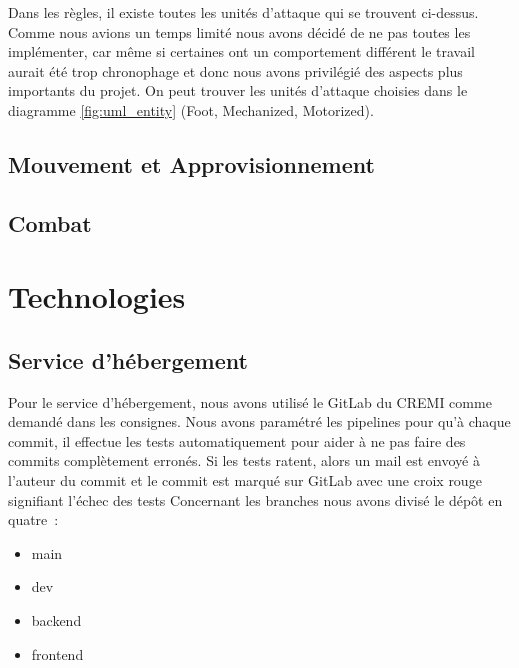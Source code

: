 Dans les règles, il existe toutes les unités d'attaque qui se trouvent ci-dessus. Comme nous avions un temps limité nous avons décidé de ne pas toutes les implémenter, car même si certaines ont un comportement différent le travail aurait été trop chronophage et donc nous avons privilégié des aspects plus importants du projet. On peut trouver les unités d'attaque choisies dans le diagramme \ref{fig:uml_entity} (Foot, Mechanized, Motorized).

\subsection{Mouvement et Approvisionnement}



\subsection{Combat}



\section{Technologies}

\subsection{Service d'hébergement}

Pour le service d'hébergement, nous avons utilisé le GitLab du CREMI comme demandé dans les consignes. Nous avons paramétré les pipelines pour qu'à chaque commit, il effectue les tests automatiquement pour aider à ne pas faire des commits complètement erronés.
Si les tests ratent, alors un mail est envoyé à l'auteur du commit et le commit est marqué sur GitLab avec une croix rouge signifiant l'échec des tests Concernant les branches nous avons divisé le dépôt en quatre :
\begin{itemize}
    \item main
    \item dev
    \item backend
    \item frontend
\end{itemize}

